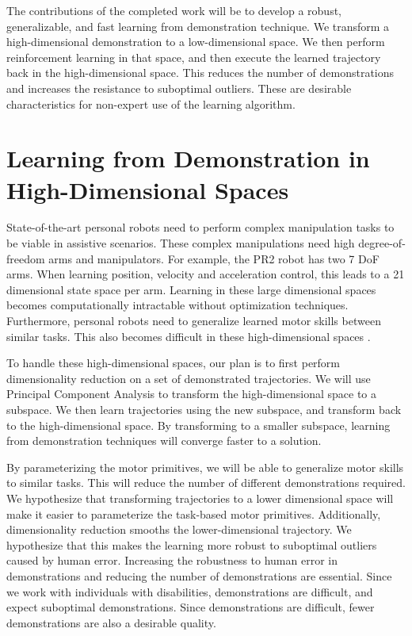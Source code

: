 \documentclass{sig-alternate}
\begin{document}

The contributions of the completed work will be to develop a robust, generalizable, and fast learning from demonstration technique. We transform a high-dimensional demonstration to a low-dimensional space. We then perform reinforcement learning in that space, and then execute the learned trajectory back in the high-dimensional space. This reduces the number of demonstrations and increases the resistance to suboptimal outliers. These are desirable characteristics for non-expert use of the learning algorithm.


\section{Learning from Demonstration in High-Dimensional Spaces}
\label{LfD in HD}


State-of-the-art personal robots need to perform complex manipulation tasks to be viable in assistive scenarios. These complex manipulations need high degree-of-freedom arms and manipulators. For example, the PR2 robot has two 7 DoF arms. When learning position, velocity and acceleration control, this leads to a 21 dimensional state space per arm. Learning in these large dimensional spaces becomes computationally intractable without optimization techniques. Furthermore, personal robots need to generalize learned motor skills between similar tasks. This also becomes difficult in these high-dimensional spaces \cite{Pastor_ICRA_2009}.

To handle these high-dimensional spaces, our plan is to first perform dimensionality reduction on a set of demonstrated trajectories. We will use Principal Component Analysis to transform the high-dimensional space to a subspace. We then learn trajectories using the new subspace, and transform back to the high-dimensional space. By transforming to a smaller subspace, learning from demonstration techniques will converge faster to a solution.

By parameterizing the motor primitives, we will be able to generalize motor skills to similar tasks.  This will reduce the number of different demonstrations required. We hypothesize that transforming trajectories to a lower dimensional space will make it easier to parameterize the task-based motor primitives. Additionally, dimensionality reduction smooths the lower-dimensional trajectory. We hypothesize that this makes the learning more robust to suboptimal outliers caused by human error. Increasing the robustness to human error in demonstrations and reducing the number of demonstrations are essential. Since we work with individuals with disabilities, demonstrations are difficult, and expect suboptimal demonstrations. Since demonstrations are difficult, fewer demonstrations are also a desirable quality.
\end{document}
